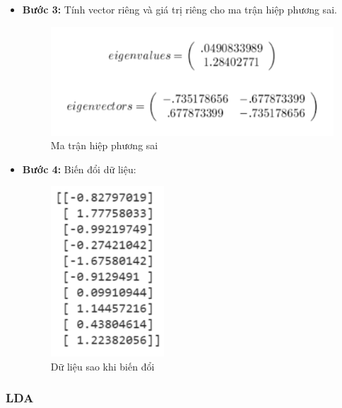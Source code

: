 \begin{itemize}
    \item \textbf{Bước 3:} Tính vector riêng và giá trị riêng cho ma trận hiệp phương sai.
    \begin{figure}[H]
        \begin{center}
            \includegraphics[scale=0.5]{images/theo2/PCA-cal-3}
            \caption{Ma trận hiệp phương sai}
        \end{center}
    \end{figure}
    
    \item \textbf{Bước 4:} Biến đổi dữ liệu:
    \begin{figure}[H]
        \begin{center}
            \includegraphics[scale=0.5]{images/theo2/PCA-cal-4}
            \caption{Dữ liệu sao khi biến đổi}
        \end{center}
    \end{figure}
\end{itemize}

\subsubsection{LDA}

